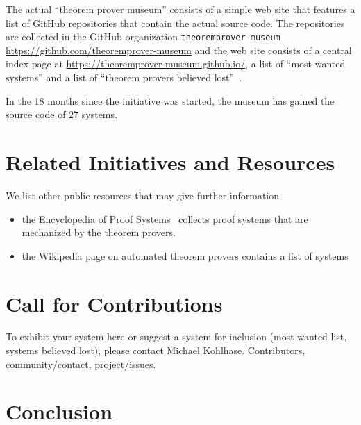 \documentclass[smallcondensed]{svjour3}
\begin{document}
The actual ``theorem prover museum'' consists of a simple web site that features a list of
GitHub repositories that contain the actual source code. The repositories are collected in
the GitHub organization \texttt{theoremprover-museum}
\url{https://github.com/theoremprover-museum} and the web site consists of a central index
page at \url{https://theoremprover-museum.github.io/}, a list of ``most wanted systems''
and a list of ``theorem provers believed lost''~\cite{tpmuseum:tpbl:on}.

In the 18 months since the initiative was started, the museum has gained the source code
of 27 systems.

\section{Related Initiatives and Resources}
We list other public resources that may give further information
\begin{itemize}
\item the Encyclopedia of Proof Systems~\cite{Wolzenlogel-Paleo:teps17} collects proof
  systems that are mechanized by the theorem provers.
\item the Wikipedia page on automated theorem provers contains a list of systems
\end{itemize}

\section{Call for Contributions}

To exhibit your system here or suggest a system for inclusion (most wanted
list, systems believed lost), please contact Michael Kohlhase. Contributors,
community/contact, project/issues.

\section{Conclusion}\label{sec:concl}

\begin{acknowledgements}
\end{acknowledgements}

\printbibliography
\end{document}
